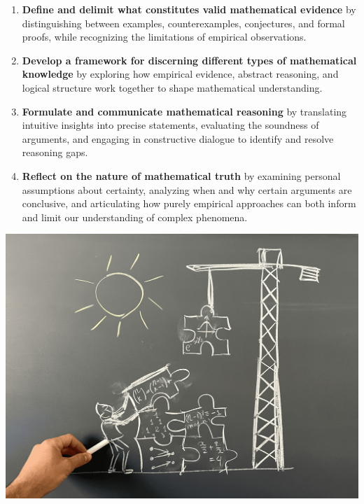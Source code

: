 \documentclass[oneside,11pt]{amsart}
\begin{document}
\begin{enumerate}[$\bullet$]
    \item \textbf{Define and delimit what constitutes valid mathematical evidence} by distinguishing between examples, counterexamples, conjectures, and formal proofs, while recognizing the limitations of empirical observations.
    \item \textbf{Develop a framework for discerning different types of mathematical knowledge} by exploring how empirical evidence, abstract reasoning, and logical structure work together to shape mathematical understanding.
    \item \textbf{Formulate and communicate mathematical reasoning} by translating intuitive insights into precise statements, evaluating the soundness of arguments, and engaging in constructive dialogue to identify and resolve reasoning gaps.
    \item \textbf{Reflect on the nature of mathematical truth} by examining personal assumptions about certainty, analyzing when and why certain arguments are conclusive, and articulating how purely empirical approaches can both inform and limit our understanding of complex phenomena.
\end{enumerate}

\begin{center}
\vspace{1cm}
\includegraphics[width=.5\textwidth]{EGMT_image.png}
\vspace{1cm}
\end{center}
\end{document}
